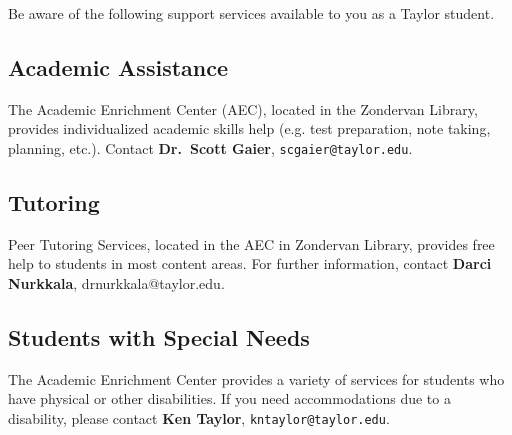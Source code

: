 Be aware of the following support services
available to you as a Taylor student.

\subsection{Academic Assistance}

The Academic Enrichment Center (AEC), located in the Zondervan Library,
provides individualized academic skills help
(e.g. test preparation, note taking, planning, etc.).
Contact \textbf{Dr.\ Scott Gaier}, \texttt{scgaier@taylor.edu}.
 
\subsection{Tutoring}

Peer Tutoring Services,
located in the AEC in Zondervan Library,
provides free help to students in most content areas.
For further information, contact
\textbf{Darci Nurkkala}, \textrm{drnurkkala@taylor.edu}.

\subsection{Students with Special Needs}

The Academic Enrichment Center provides a variety of services
for students who have physical or other disabilities.
If you need accommodations due to a disability, please contact
\textbf{Ken Taylor}, \texttt{kntaylor@taylor.edu}.

